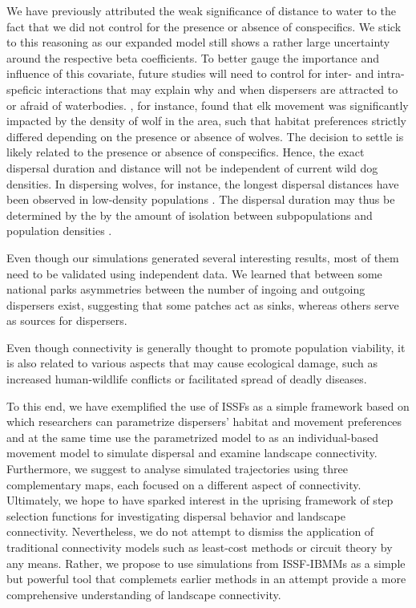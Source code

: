 \documentclass[abstract=on,10pt,a4paper,bibliography=totocnumbered]{article}
\begin{document}
We have previously attributed the weak significance of distance to water to the
fact that we did not control for the presence or absence of conspecifics. We
stick to this reasoning as our expanded model still shows a rather large
uncertainty around the respective beta coefficients. To better gauge the
importance and influence of this covariate, future studies will need to control
for inter- and intra-speficic interactions that may explain why and when
dispersers are attracted to or afraid of waterbodies. \cite{Fortin.2005}, for
instance, found that elk movement was significantly impacted by the density of
wolf in the area, such that habitat preferences strictly differed depending on
the presence or absence of wolves. The decision to settle is likely related to
the presence or absence of conspecifics. Hence, the exact dispersal duration and
distance will not be independent of current wild dog densities. In dispersing
wolves, for instance, the longest dispersal distances have been observed in
low-density populations \citep{Boyd.2005, Wabakken.2007}. The dispersal duration
may thus be determined by the by the amount of isolation between subpopulations
and population densities \citep{DaviesMostert.2012}.

Even though our simulations generated several interesting results, most of them
need to be validated using independent data. We learned that between some
national parks asymmetries between the number of ingoing and outgoing dispersers
exist, suggesting that some patches act as sinks, whereas others serve as
sources for dispersers.

Even though connectivity is generally thought to promote population viability,
it is also related to various aspects that may cause ecological damage, such as
increased human-wildlife conflicts or facilitated spread of deadly diseases.

To this end, we have exemplified the use of ISSFs as a simple framework based on
which researchers can parametrize dispersers' habitat and movement preferences
and at the same time use the parametrized model to as an individual-based
movement model to simulate dispersal and examine landscape connectivity.
Furthermore, we suggest to analyse simulated trajectories using three
complementary maps, each focused on a different aspect of connectivity.
Ultimately, we hope to have sparked interest in the uprising framework of step
selection functions for investigating dispersal behavior and landscape
connectivity. Nevertheless, we do not attempt to dismiss the application of
traditional connectivity models such as least-cost methods or circuit theory by
any means. Rather, we propose to use simulations from ISSF-IBMMs as a simple but
powerful tool that complemets earlier methods in an attempt provide a more
comprehensive understanding of landscape connectivity.
\end{document}
